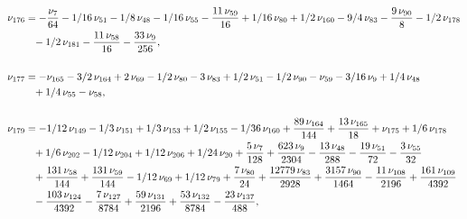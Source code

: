 \documentclass[a4paper,12pt, DIV=14, BCOR=5mm, twoside, headsepline]{scrbook}
\begin{document}
\begin{align}
\begin{aligned}
\nu_{{176}}&=-{\frac {\nu_{{7}}}{64}}-1/16\,\nu_{{51
}}-1/8\,\nu_{{48}}-1/16\,\nu_{{55}}-{\frac {11\,\nu_{{59}}}{16}}+1/16
\,\nu_{{80}}+1/2\,\nu_{{160}}-9/4\,\nu_{{83}}-{\frac {9\,\nu_{{90}}}{8
}}-1/2\,\nu_{{178}}\\
 &\hphantom{=}-1/2\,\nu_{{181}}-{\frac {11\,\nu_{{58}}}{16}}-{
\frac {33\,\nu_{{9}}}{256}}, \\
\\
\nu_{{177}}&=-\nu_{{165}}-3/2\,\nu_{{164}}+
2\,\nu_{{69}}-1/2\,\nu_{{80}}-3\,\nu_{{83}}+1/2\,\nu_{{51}}-1/2\,\nu_{
{90}}-\nu_{{59}}-3/16\,\nu_{{9}}+1/4\,\nu_{{48}}\\
 &\hphantom{=}+1/4\,\nu_{{55}}-\nu_{
{58}}, \\
\\
\nu_{{179}}&=-1/12\,\nu_{{149}}-1/3\,\nu_{{151}}+1/3\,\nu_{{153}}
+1/2\,\nu_{{155}}-1/36\,\nu_{{160}}+{\frac {89\,\nu_{{164}}}{144}}+{
\frac {13\,\nu_{{165}}}{18}}+\nu_{{175}}+1/6\,\nu_{{178}}\\
 &\hphantom{=}+1/6\,\nu_{{
202}}-1/12\,\nu_{{204}}+1/12\,\nu_{{206}}+1/24\,\nu_{{20}}+{\frac {5\,
\nu_{{7}}}{128}}+{\frac {623\,\nu_{{9}}}{2304}}-{\frac {13\,\nu_{{48}}
}{288}}-{\frac {19\,\nu_{{51}}}{72}}-{\frac {3\,\nu_{{55}}}{32}}\\
 &\hphantom{=}+{
\frac {131\,\nu_{{58}}}{144}}+{\frac {131\,\nu_{{59}}}{144}}-1/12\,\nu
_{{69}}+1/12\,\nu_{{79}}+{\frac {7\,\nu_{{80}}}{24}}+{\frac {12779\,
\nu_{{83}}}{2928}}+{\frac {3157\,\nu_{{90}}}{1464}}-{\frac {11\,\nu_{{
108}}}{2196}}+{\frac {161\,\nu_{{109}}}{4392}}\\
 &\hphantom{=}-{\frac {103\,\nu_{{124}
}}{4392}}-{\frac {7\,\nu_{{127}}}{8784}}+{\frac {59\,\nu_{{131}}}{2196
}}+{\frac {53\,\nu_{{132}}}{8784}}-{\frac {23\,\nu_{{137}}}{488}}, 
\end{aligned}
\end{align}
\end{document}

